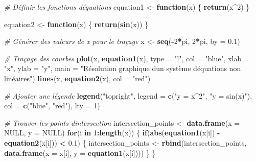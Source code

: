 \documentclass[
]{article}
\newenvironment{Shaded}{\begin{snugshade}}{\end{snugshade}}
\newcommand{\AttributeTok}[1]{\textcolor[rgb]{0.13,0.29,0.53}{#1}}
\newcommand{\CommentTok}[1]{\textcolor[rgb]{0.56,0.35,0.01}{\textit{#1}}}
\newcommand{\ConstantTok}[1]{\textcolor[rgb]{0.56,0.35,0.01}{#1}}
\newcommand{\ControlFlowTok}[1]{\textcolor[rgb]{0.13,0.29,0.53}{\textbf{#1}}}
\newcommand{\DecValTok}[1]{\textcolor[rgb]{0.00,0.00,0.81}{#1}}
\newcommand{\FloatTok}[1]{\textcolor[rgb]{0.00,0.00,0.81}{#1}}
\newcommand{\FunctionTok}[1]{\textcolor[rgb]{0.13,0.29,0.53}{\textbf{#1}}}
\newcommand{\NormalTok}[1]{#1}
\newcommand{\OtherTok}[1]{\textcolor[rgb]{0.56,0.35,0.01}{#1}}
\newcommand{\SpecialCharTok}[1]{\textcolor[rgb]{0.81,0.36,0.00}{\textbf{#1}}}
\newcommand{\StringTok}[1]{\textcolor[rgb]{0.31,0.60,0.02}{#1}}
\begin{document}
\begin{Shaded}
\begin{Highlighting}[]
\CommentTok{\# Définir les fonctions d\textquotesingle{}équations}
\NormalTok{equation1 }\OtherTok{\textless{}{-}} \ControlFlowTok{function}\NormalTok{(x) \{}
  \FunctionTok{return}\NormalTok{(x}\SpecialCharTok{\^{}}\DecValTok{2}\NormalTok{)}
\NormalTok{\}}

\NormalTok{equation2 }\OtherTok{\textless{}{-}} \ControlFlowTok{function}\NormalTok{(x) \{}
  \FunctionTok{return}\NormalTok{(}\FunctionTok{sin}\NormalTok{(x))}
\NormalTok{\}}

\CommentTok{\# Générer des valeurs de x pour le traçage}
\NormalTok{x }\OtherTok{\textless{}{-}} \FunctionTok{seq}\NormalTok{(}\SpecialCharTok{{-}}\DecValTok{2}\SpecialCharTok{*}\NormalTok{pi, }\DecValTok{2}\SpecialCharTok{*}\NormalTok{pi, }\AttributeTok{by =} \FloatTok{0.1}\NormalTok{)}

\CommentTok{\# Traçage des courbes}
\FunctionTok{plot}\NormalTok{(x, }\FunctionTok{equation1}\NormalTok{(x), }\AttributeTok{type =} \StringTok{"l"}\NormalTok{, }\AttributeTok{col =} \StringTok{"blue"}\NormalTok{, }\AttributeTok{xlab =} \StringTok{"x"}\NormalTok{, }\AttributeTok{ylab =} \StringTok{"y"}\NormalTok{, }\AttributeTok{main =} \StringTok{"Résolution graphique d\textquotesingle{}un système d\textquotesingle{}équations non linéaires"}\NormalTok{)}
\FunctionTok{lines}\NormalTok{(x, }\FunctionTok{equation2}\NormalTok{(x), }\AttributeTok{col =} \StringTok{"red"}\NormalTok{)}

\CommentTok{\# Ajouter une légende}
\FunctionTok{legend}\NormalTok{(}\StringTok{"topright"}\NormalTok{, }\AttributeTok{legend =} \FunctionTok{c}\NormalTok{(}\StringTok{"y = x\^{}2"}\NormalTok{, }\StringTok{"y = sin(x)"}\NormalTok{), }\AttributeTok{col =} \FunctionTok{c}\NormalTok{(}\StringTok{"blue"}\NormalTok{, }\StringTok{"red"}\NormalTok{), }\AttributeTok{lty =} \DecValTok{1}\NormalTok{)}

\CommentTok{\# Trouver les points d\textquotesingle{}intersection}
\NormalTok{intersection\_points }\OtherTok{\textless{}{-}} \FunctionTok{data.frame}\NormalTok{(}\AttributeTok{x =} \ConstantTok{NULL}\NormalTok{, }\AttributeTok{y =} \ConstantTok{NULL}\NormalTok{)}
\ControlFlowTok{for}\NormalTok{(i }\ControlFlowTok{in} \DecValTok{1}\SpecialCharTok{:}\FunctionTok{length}\NormalTok{(x)) \{}
  \ControlFlowTok{if}\NormalTok{(}\FunctionTok{abs}\NormalTok{(}\FunctionTok{equation1}\NormalTok{(x[i]) }\SpecialCharTok{{-}} \FunctionTok{equation2}\NormalTok{(x[i])) }\SpecialCharTok{\textless{}} \FloatTok{0.1}\NormalTok{) \{}
\NormalTok{    intersection\_points }\OtherTok{\textless{}{-}} \FunctionTok{rbind}\NormalTok{(intersection\_points, }\FunctionTok{data.frame}\NormalTok{(}\AttributeTok{x =}\NormalTok{ x[i], }\AttributeTok{y =} \FunctionTok{equation1}\NormalTok{(x[i])))}
\NormalTok{  \}}
\NormalTok{\}}


\end{Highlighting}
\end{Shaded}
\end{document}
